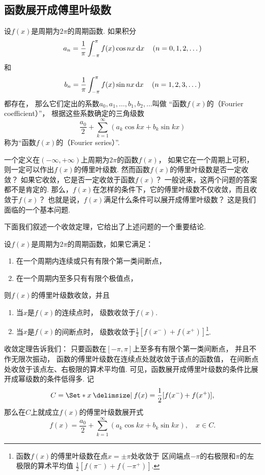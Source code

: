 \subsection{函数展开成傅里叶级数}
\begin{definition}\label{definition:无穷级数.傅里叶级数}
设\(f(x)\)是周期为\(2 \pi\)的周期函数.
如果积分\[
a_n = \frac{1}{\pi} \int_{-\pi}^{\pi} f(x) \cos nx \dd{x} \quad(n=0,1,2,\dotsc)
\]和\[
b_n = \frac{1}{\pi} \int_{-\pi}^{\pi} f(x) \sin nx \dd{x} \quad(n=1,2,3,\dotsc)
\]都存在，%
那么它们定出的系数\(a_0,a_1,\dotsc,b_1,b_2,\dotsc\)叫做%
“函数\(f(x)\)的（Fourier coefficient）”，%
根据这些系数确定的三角级数\[
\frac{a_0}{2} + \sum\limits_{k=1}^\infty (a_k \cos{kx} + b_k \sin kx)
\]称为“函数\(f(x)\)的（Fourier series）”.
\end{definition}

一个定义在\((-\infty,+\infty)\)上周期为\(2\pi\)的函数\(f(x)\)，%
如果它在一个周期上可积，%
则一定可以作出\(f(x)\)的傅里叶级数.
然而函数\(f(x)\)的傅里叶级数是否一定收敛？
如果它收敛，它是否一定收敛于函数\(f(x)\)？
一般说来，这两个问题的答案都不是肯定的.
那么，\(f(x)\)在怎样的条件下，它的傅里叶级数不仅收敛，而且收敛于\(f(x)\)？
也就是说，\(f(x)\)满足什么条件可以展开成傅里叶级数？
这是我们面临的一个基本问题.

下面我们叙述一个收敛定理，它给出了上述问题的一个重要结论.
\begin{theorem}\label{theorem:无穷级数.傅里叶级数收敛的狄利克雷充分条件}
设\(f(x)\)是周期为\(2 \pi\)的周期函数，如果它满足：
\begin{enumerate}
\item 在一个周期内连续或只有有限个第一类间断点，%
\item 在一个周期内至多只有有限个极值点，%
\end{enumerate}
则\(f(x)\)的傅里叶级数收敛，并且
\begin{enumerate}
\item 当\(x\)是\(f(x)\)的连续点时，%
级数收敛于\(f(x)\).

\item 当\(x\)是\(f(x)\)的间断点时，%
级数收敛于\(\frac{1}{2} [ f(x^-) + f(x^+) ]\)\footnote{%
函数\(f(x)\)的傅里叶级数在点\(x=\pm\pi\)处收敛于%
区间端点\(-\pi\)的右极限和\(\pi\)的左极限的算术平均值%
\(\frac{1}{2} [ f(\pi^-) + f(-\pi^+) ]\).}.
\end{enumerate}
\end{theorem}

收敛定理告诉我们：
只要函数在\([-\pi,\pi]\)上至多有有限个第一类间断点，%
并且不作无限次振动，%
函数的傅里叶级数在连续点处就收敛于该点的函数值，%
在间断点处收敛于该点左、右极限的算术平均值.
可见，函数展开成傅里叶级数的条件比展开成幂级数的条件低得多.
记
\begin{equation}
C = \Set*{
	x \given
	f(x) = \frac{1}{2} [ f(x^-) + f(x^+) ]
},
\end{equation}
那么在\(C\)上就成立\(f(x)\)的傅里叶级数展开式\[
f(x) = \frac{a_0}{2} + \sum\limits_{k=1}^\infty (a_k \cos{kx} + b_k \sin kx),
\quad x \in C.
\]

